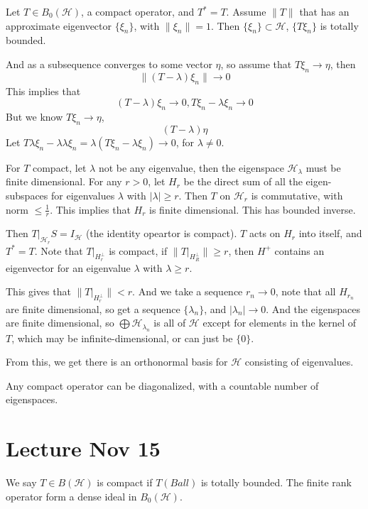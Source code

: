Let $T\in B_0(\mathcal{H})$, a compact operator, and $T^*=T$. Assume $\|T\|$ that has an approximate eigenvector $\{\xi_n\}$, with $\|\xi_n\|=1$. Then $\{\xi_n\}\subset\mathcal{H}$, $\{T\xi_n\}$ is totally bounded.

And as a subsequence converges to some vector $\eta$, so assume that $T\xi_n\to \eta$, then 
\begin{equation*}
    \|(T-\lambda)\xi_n\|\to 0
\end{equation*}
 This implies that 
 \begin{equation*}
    (T-\lambda)\xi_n\to 0, T\xi_n-\lambda\xi_n\to 0
 \end{equation*}
 But we know $T\xi_n\to\eta$, 
 \begin{equation*}
    (T-\lambda)\eta
 \end{equation*}
 Let $T\lambda\xi_n-\lambda\lambda\xi_n=\lambda(T\xi_n-\lambda\xi_n)\to 0$, for $\lambda\neq 0$.

For $T$ compact, let $\lambda$ not be any eigenvalue, then the eigenspace $\mathcal{H}_\lambda$ must be finite dimensional. For any $r>0$, let $H_r$ be the direct sum of all the eigen-subspaces for eigenvalues $\lambda$ with $|\lambda|\geq r$. Then  $T$ on $\mathcal{H}_r$ is commutative, with norm $\leq\frac{1}{r}$. This implies that $H_r$ is finite dimensional. This has bounded inverse. 

Then $T\vert_{\mathcal{H}_r}S=I_\mathcal{H}$ (the identity opeartor is compact). $T$ acts on $H_r$ into itself, and $T^*=T$. Note that $T\vert_{H_r^\perp}$ is compact, if $\|T\vert_{H_R^\perp}\|\geq r$, then $H^+$ contains an eigenvector for an eigenvalue $\lambda$ with $\lambda\geq r$.

This gives that $\|T\vert_{H_r^\perp}\|<r$. And we take a sequence $r_n\to 0$, note that all $H_{r_n}$ are finite dimensional, so get a sequence $\{\lambda_n\}$, and $|\lambda_n|\to 0$. And the eigenspaces are finite dimensional, so $\bigoplus\mathcal{H}_{\lambda_n}$ is all of $\mathcal{H}$ except for elements in the kernel of $T$, which may be infinite-dimensional, or can just be $\{0\}$.
 
From this, we get there is an orthonormal basis for $\mathcal{H}$ consisting of eigenvalues.
\begin{note}
    Any compact operator can be diagonalized, with a countable number of eigenspaces.
\end{note}

\section{Lecture Nov 15}
We say $T\in B(\mathcal{H})$ is compact if $T(Ball)$ is totally bounded. The finite rank operator form a dense ideal in $B_0(\mathcal{\mathcal{H}})$. 

